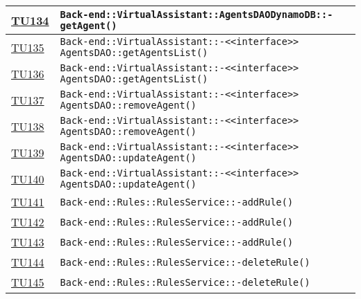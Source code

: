 \begin{longtable}{|>{\centering}m{1cm}|m{12cm}<{\centering}|}
\hyperlink{TU134}{TU134} & \texttt{Back-end::VirtualAssistant::AgentsDAODynamoDB::-\linebreak getAgent()}\\ \hline

\hyperlink{TU135}{TU135} & \texttt{Back-end::VirtualAssistant::-\linebreak <<interface>> AgentsDAO::getAgentsList()}\\ \hline

\hyperlink{TU136}{TU136} & \texttt{Back-end::VirtualAssistant::-\linebreak <<interface>> AgentsDAO::getAgentsList()}\\ \hline

\hyperlink{TU137}{TU137} & \texttt{Back-end::VirtualAssistant::-\linebreak <<interface>> AgentsDAO::removeAgent()}\\ \hline

\hyperlink{TU138}{TU138} & \texttt{Back-end::VirtualAssistant::-\linebreak <<interface>> AgentsDAO::removeAgent()}\\ \hline

\hyperlink{TU139}{TU139} & \texttt{Back-end::VirtualAssistant::-\linebreak <<interface>> AgentsDAO::updateAgent()}\\ \hline

\hyperlink{TU140}{TU140} & \texttt{Back-end::VirtualAssistant::-\linebreak <<interface>> AgentsDAO::updateAgent()}\\ \hline

\hyperlink{TU141}{TU141} & \texttt{Back-end::Rules::RulesService::-\linebreak addRule()}\\ \hline

\hyperlink{TU142}{TU142} & \texttt{Back-end::Rules::RulesService::-\linebreak addRule()}\\ \hline

\hyperlink{TU143}{TU143} & \texttt{Back-end::Rules::RulesService::-\linebreak addRule()}\\ \hline

\hyperlink{TU144}{TU144} & \texttt{Back-end::Rules::RulesService::-\linebreak deleteRule()}\\ \hline

\hyperlink{TU145}{TU145} & \texttt{Back-end::Rules::RulesService::-\linebreak deleteRule()}\\ \hline


\end{longtable}
